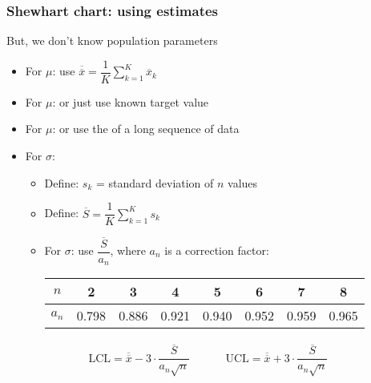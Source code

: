 \begin{frame}\frametitle{Shewhart chart: using estimates}

	But, we don't know population parameters
	\begin{itemize}
		\item	For $\mu$: use $\overline{\overline{x}} = \dfrac{1}{K} \displaystyle \sum_{k=1}^{K}{ \overline{x}_k}$
		\item	For $\mu$: or just use known target value
		\item	For $\mu$: or use the {} of a long sequence of data
		\item	For $\sigma$:
		\begin{itemize}
			\item	Define: $s_k$ = standard deviation of $n$ values
			\item	Define: $\overline{S} = \dfrac{1}{K} \displaystyle \sum_{k=1}^{K}{s_k}$
			\item	For $\sigma$: use $\dfrac{\overline{S}}{a_n}$, where $a_n$ is a correction factor:
			
				\vspace{6pt}
				\begin{tabular}{|c|ccccccc|}\hline
					$n$		&	2		&	3		&	4		&	5		&	6		&	7		&	8		\\ \hline
					$a_n$	&	0.798	&	0.886	&	0.921	&	0.940	&	0.952	&	0.959	&	0.965	\\ \hline
				\end{tabular}
		\end{itemize}
	\end{itemize}
	
	$$
	\begin{array}{rcccl}
		\text{LCL} = \overline{\overline{x}} - 3 \cdot \dfrac{\overline{S}}{a_n\sqrt{n}} && && \text{UCL} = \overline{\overline{x}} + 3 \cdot \dfrac{\overline{S}}{a_n\sqrt{n}}
	\end{array}
	$$
\end{frame}

